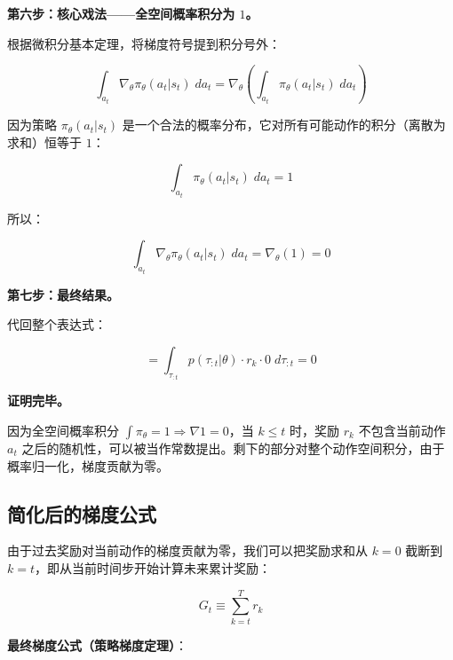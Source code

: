 \documentclass[12pt,a4paper]{article}
\newcommand{\grad}{\nabla}
\theoremstyle{noteplain}
\theoremstyle{noteexercise}
\begin{document}
\textbf{第六步：核心戏法——全空间概率积分为 $1$。}

根据微积分基本定理，将梯度符号提到积分号外：

\begin{equation}\label{eq:grad-int-switch}
  \int_{a_t} \grad_\theta \pi_\theta(a_t|s_t) \; da_t
  = \grad_\theta\!\left( \int_{a_t} \pi_\theta(a_t|s_t) \; da_t \right)
\end{equation}

因为策略 $\pi_\theta(a_t|s_t)$ 是一个合法的概率分布，它对所有可能动作的积分（离散为求和）恒等于 $1$：

\begin{equation}\label{eq:pi-integral-1}
  \int_{a_t} \pi_\theta(a_t|s_t) \; da_t = 1
\end{equation}

所以：

\begin{equation}\label{eq:grad-of-1}
  \int_{a_t} \grad_\theta \pi_\theta(a_t|s_t) \; da_t = \grad_\theta(1) = 0
\end{equation}

\textbf{第七步：最终结果。}

代回整个表达式：

\begin{equation}\label{eq:final-zero}
  = \int_{\tau_{:t}} p(\tau_{:t}|\theta) \cdot r_k \cdot 0 \; d\tau_{:t} = 0
\end{equation}

\textbf{证明完毕。}

\begin{summarybox}[核心直观总结]
  因为全空间概率积分 $\int \pi_\theta = 1 \Rightarrow \grad 1 = 0$，当 $k \le t$ 时，奖励 $r_k$ 不包含当前动作 $a_t$ 之后的随机性，可以被当作常数提出。剩下的部分对整个动作空间积分，由于概率归一化，梯度贡献为零。
\end{summarybox}

\subsection{简化后的梯度公式}\label{ssec:simplified}

由于过去奖励对当前动作的梯度贡献为零，我们可以把奖励求和从 $k=0$ 截断到 $k=t$，即从当前时间步开始计算未来累计奖励：

\begin{equation}\label{eq:Gt-def}
  G_t \equiv \sum_{k=t}^{T} r_k
\end{equation}

\textbf{最终梯度公式（策略梯度定理）}：
\end{document}
